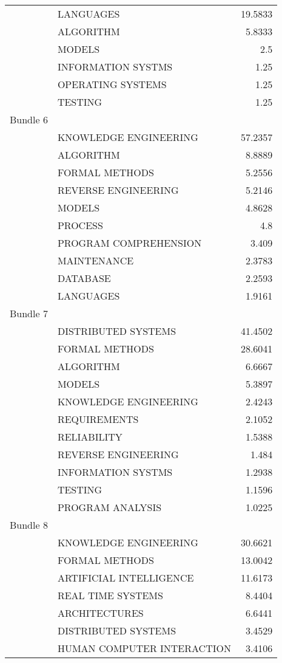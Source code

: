 \begin{center}
\begin{longtable}{|llr|}
	~ & LANGUAGES & 19.5833 \\
	~ & ALGORITHM & 5.8333 \\
	~ & MODELS & 2.5 \\
	~ & INFORMATION SYSTMS & 1.25 \\
	~ & OPERATING SYSTEMS & 1.25 \\
	~ & TESTING & 1.25 \\
	Bundle 6 & ~ & ~  \\
	~ & KNOWLEDGE ENGINEERING & 57.2357 \\
	~ & ALGORITHM & 8.8889 \\
	~ & FORMAL METHODS & 5.2556 \\
	~ & REVERSE ENGINEERING & 5.2146 \\
	~ & MODELS & 4.8628 \\
	~ & PROCESS & 4.8 \\
	~ & PROGRAM COMPREHENSION & 3.409 \\
	~ & MAINTENANCE & 2.3783 \\
	~ & DATABASE & 2.2593 \\
	~ & LANGUAGES & 1.9161 \\
	Bundle 7 & ~ & ~  \\
	~ & DISTRIBUTED SYSTEMS & 41.4502 \\
	~ & FORMAL METHODS & 28.6041 \\
	~ & ALGORITHM & 6.6667 \\
	~ & MODELS & 5.3897 \\
	~ & KNOWLEDGE ENGINEERING & 2.4243 \\
	~ & REQUIREMENTS & 2.1052 \\
	~ & RELIABILITY & 1.5388 \\
	~ & REVERSE ENGINEERING & 1.484 \\
	~ & INFORMATION SYSTMS & 1.2938 \\
	~ & TESTING & 1.1596 \\
	~ & PROGRAM ANALYSIS & 1.0225 \\
	Bundle 8 & ~ & ~  \\
	~ & KNOWLEDGE ENGINEERING & 30.6621 \\
	~ & FORMAL METHODS & 13.0042 \\
	~ & ARTIFICIAL INTELLIGENCE & 11.6173 \\
	~ & REAL TIME SYSTEMS & 8.4404 \\
	~ & ARCHITECTURES & 6.6441 \\
	~ & DISTRIBUTED SYSTEMS & 3.4529 \\
	~ & HUMAN COMPUTER INTERACTION & 3.4106 \\

\end{longtable}
\end{center}
